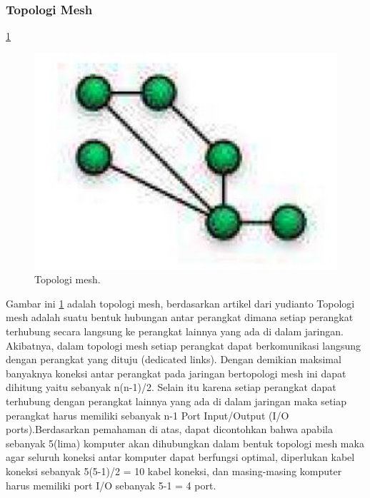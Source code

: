   \subsubsection{Topologi Mesh}
    \ref{mesh}
    \begin{figure}[ht]
    \centerline{\includegraphics[width=1\textwidth]{figures/mesh.JPG}}
    \caption{Topologi mesh.}
    \label{mesh}
    \end{figure}
    Gambar ini \ref{mesh} adalah topologi mesh, berdasarkan artikel dari yudianto Topologi mesh adalah suatu bentuk hubungan antar perangkat dimana setiap perangkat terhubung secara langsung ke perangkat lainnya yang ada di dalam jaringan\cite{yudianto2007jaringan}. Akibatnya, dalam topologi mesh setiap perangkat dapat berkomunikasi langsung dengan perangkat yang dituju (dedicated links). Dengan demikian maksimal banyaknya koneksi antar perangkat pada jaringan bertopologi mesh ini dapat dihitung yaitu sebanyak n(n-1)/2. Selain itu karena setiap perangkat dapat terhubung dengan perangkat lainnya yang ada di dalam jaringan maka setiap perangkat harus memiliki sebanyak n-1 Port Input/Output (I/O ports).Berdasarkan pemahaman di atas, dapat dicontohkan bahwa apabila sebanyak 5(lima) komputer akan dihubungkan dalam bentuk topologi mesh maka agar seluruh koneksi antar komputer dapat berfungsi optimal, diperlukan kabel koneksi sebanyak 5(5-1)/2 = 10 kabel koneksi, dan masing-masing komputer harus memiliki port I/O sebanyak 5-1 = 4 port.
